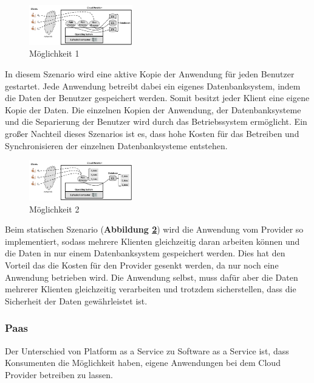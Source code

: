 \begin{figure}[H]
    \centering
	\includegraphics[width=0.4\textwidth]{Images/SaaSM1}
	\caption{Möglichkeit 1 \cite{Badger}}
	\label{SaaSM1}
\end{figure}

In diesem Szenario wird eine aktive Kopie der Anwendung für jeden Benutzer gestartet. Jede Anwendung betreibt dabei ein eigenes Datenbanksystem, indem die Daten der Benutzer gespeichert werden.
Somit besitzt jeder Klient eine eigene Kopie der Daten. Die einzelnen Kopien der Anwendung, der Datenbanksysteme und die Separierung der Benutzer wird durch das Betriebssystem ermöglicht.
Ein großer Nachteil dieses Szenarios ist es, dass hohe Kosten für das Betreiben und Synchronisieren der einzelnen Datenbanksysteme entstehen.


\begin{figure}[H]
    \centering
	\includegraphics[width=0.4\textwidth]{Images/SaaSM2}
	\caption{Möglichkeit 2 \cite{Badger}}
	\label{SaaSM2}
\end{figure}

Beim statischen Szenario (\textbf{Abbildung \ref{SaaSM2}}) wird die Anwendung vom Provider so implementiert, sodass mehrere Klienten gleichzeitig daran arbeiten können und die Daten in nur einem Datenbanksystem gespeichert werden. 
Dies hat den Vorteil das die Kosten für den Provider gesenkt werden, da nur noch eine Anwendung betrieben wird.
Die Anwendung selbst, muss dafür aber die Daten mehrerer Klienten gleichzeitig verarbeiten und trotzdem sicherstellen, dass die Sicherheit der Daten gewährleistet ist.   

\subsubsection{Paas}

Der Unterschied von Platform as a Service zu Software as a Service ist, dass Konsumenten die Möglichkeit haben, eigene Anwendungen bei dem Cloud Provider betreiben zu lassen.

